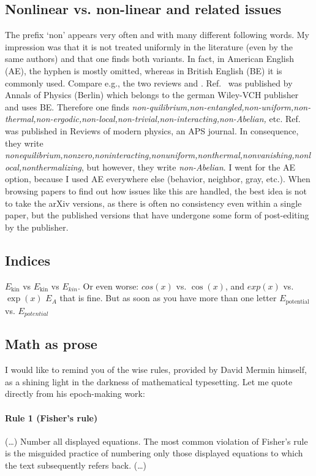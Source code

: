 \subsection{Nonlinear vs. non-linear and related issues}
The prefix `non' appears very often and with many different following words. My impression was that it is not treated uniformly in the literature (even by the same authors) and that one finds both variants. In fact, in American English (AE), the hyphen is mostly omitted, whereas in British English (BE) it is commonly used. Compare e.g., the two reviews \cite{abaninRecentProgressManybody2017} and \cite{abaninColloquiumManybodyLocalization2019}. Ref.~\cite{abaninRecentProgressManybody2017} was published by Annals of Physics (Berlin) which belongs to the german Wiley-VCH publisher and uses BE. Therefore one finds \emph{non-quilibrium,non-entangled,non-uniform,non-thermal,non-ergodic,non-local,non-trivial,non-interacting,non-Abelian,} etc.
Ref.~\cite{abaninColloquiumManybodyLocalization2019} was published in Reviews of modern physics, an APS journal. In consequence, they write \emph{nonequilibrium,nonzero,noninteracting,nonuniform,nonthermal,nonvanishing,nonlocal,nonthermalizing}, but however, they write \emph{non-Abelian}. I went for the AE option, because I used AE everywhere else (behavior, neighbor, gray, etc.).
When browsing papers to find out how issues like this are handled, the best idea is not to take the arXiv versions, as there is often no consistency even within a single paper, but the published versions that have undergone some form of post-editing by the publisher.


\subsection{Indices}
$E_\text{kin}$ vs $E_\mathrm{kin}$ vs $E_{kin}$. Or even worse: $cos (x) $ vs. $\cos (x)$, and $exp (x) $ vs. $\exp (x)$
$E_A$ that is fine. But as soon as you have more than one letter $E_\text{potential}$ vs. $E_{potential}$


\subsection{Math as prose}
I would like to remind you of the wise rules, provided by David Mermin himself, as a shining light in the darkness of mathematical typesetting. Let me quote directly from his epoch-making work:
\paragraph{Rule 1 (Fisher's rule)} (\dots) Number all displayed equations. The most common violation of Fisher's rule is the misguided practice of numbering only those displayed equations to which the text subsequently refers back. (\dots)
